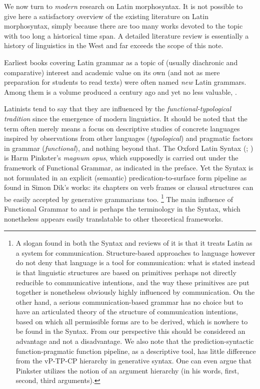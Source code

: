 \documentclass[a4paper, oneside, 12pt]{report}
\newcommand*{\term}[1]{\emph{#1}}
\newcommand{\form}[1]{\emph{#1}}
\begin{document}
We now turn to \emph{modern} research on Latin morphosyntax.
It is not possible to give here a satisfactory overview of the existing literature on Latin morphosyntax,
simply because there are too many works devoted to the topic with too long a historical time span.
A detailed literature review is essentially a history of linguistics in the West
and far exceeds the scope of this note.

Earliest books covering Latin grammar as a topic of (usually diachronic and comparative) interest and academic value on its own 
(and not as mere preparation for students to read texts) were often named \emph{new} Latin grammars.
Among them is a volume produced a century ago and yet no less valuable,
\citet{allen1903allen}.


Latinists tend to say that they are influenced by the \term{functional-typological tradition} since the emergence of modern linguistics.
It should be noted that the term often merely means a focus on descriptive studies of concrete languages inspired by observations from other languages (\term{typological})
and pragmatic factors in grammar (\term{functional}), and nothing beyond that.
The Oxford Latin Syntax (\citealt{Pinkster1}; \citealt{pinkster2}) is Harm Pinkster's \form{magnum opus},
which supposedly is carried out under the framework of Functional Grammar, as indicated in the preface.
Yet the Syntax is not formulated in an explicit (semantic) predication-to-surface form pipeline as found in Simon Dik's works:
its chapters on verb frames or clausal structures can be easily accepted by generative grammarians too.%
\footnote{
    A slogan found in both the Syntax and reviews of it is that it treats Latin as a system for communication.
    Structure-based approaches to language however do not deny that language is a tool for communication:
    what is stated instead is that linguistic structures are based on primitives perhaps not directly reducible to communicative intentions,
    and the way these primitives are put together is nonetheless obviously highly influenced by communication.
    On the other hand, a serious communication-based grammar has no choice but to have an articulated theory of the structure of communication intentions, based on which all permissible forms are to be derived,
    which is nowhere to be found in the Syntax.
    From our perspective this should be considered an advantage and not a disadvantage.
    We also note that the prediction-syntactic function-pragmatic function pipeline,
    as a descriptive tool, has little difference from the vP-TP-CP hierarchy in generative syntax.
    One can even argue that Pinkster utilizes the notion of an argument hierarchy (in his words, first, second, third arguments).
}
The main influence of Functional Grammar to \citet{Pinkster1} and \citet{pinkster2} is perhaps the terminology in the Syntax,
which nonetheless appears easily translatable to other theoretical frameworks.
\end{document}
